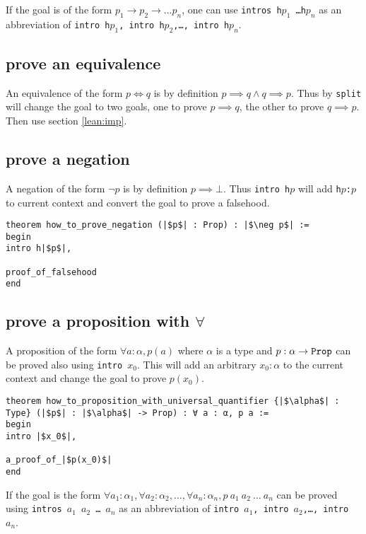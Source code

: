 \documentclass{report}
\theoremstyle{definition}
\theoremstyle{plain}
\begin{document}
If the goal is of the form $p_1\to p_2\to\dots p_n$, one can use {\tt \small intros h$p_1$ \dots h$p_n$} as an abbreviation of {\tt \small intro h$p_1$, intro h$p_2$,\dots, intro h$p_n$}.


\subsection{prove an equivalence}\label{lean:eqv}
An equivalence of the form $p \iff q$ is by definition $p\implies q \land q\implies p$. Thus by {\tt \small split} will change the goal to two goals, one to prove $p\implies q$, the other to prove $q \implies p$. Then use section \ref{lean:imp}.

\subsection{prove a negation}
A negation of the form $\neg p$ is by definition $p \implies \bot$. Thus {\tt \small intro h$p$} will add {\tt \small h$p$:$p$} to current context and convert the goal to prove a falsehood.

\begin{verbatim}
theorem how_to_prove_negation (|$p$| : Prop) : |$\neg p$| :=
begin
intro h|$p$|,

proof_of_falsehood
end
\end{verbatim}

\subsection{prove a proposition with $\forall$}\label{lean:forall}
A proposition of the form $\forall a : \alpha, p(a)$ where $\alpha$ is a type and $p : \alpha\to {\tt \small Prop}$ can be proved also using {\tt \small intro $x_0$}. This will add an arbitrary $x_0:\alpha$ to the current context and change the goal to prove $p(x_0)$.

\begin{verbatim}
theorem how_to_proposition_with_universal_quantifier {|$\alpha$| : Type} (|$p$| : |$\alpha$| -> Prop) : ∀ a : α, p a :=
begin
intro |$x_0$|,

a_proof_of_|$p(x_0)$|
end
\end{verbatim}

If the goal is the form $\forall a_1:\alpha_1,\forall a_2:\alpha_2,\dots,\forall a_n:\alpha_n, p\ a_1\ a_2\ \dots\ a_n$ can be proved using {\tt \small intros $a_1$ $a_2$ \dots\  $a_n$} as an abbreviation of {\tt \small intro $a_1$, intro $a_2$,\dots, intro $a_n$}.
\end{document}
